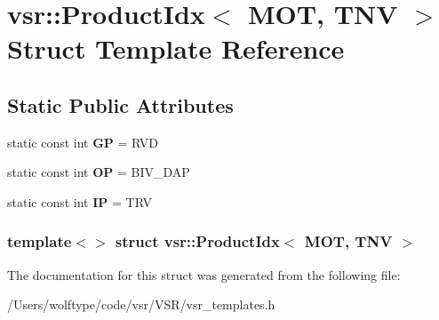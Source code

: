 \hypertarget{structvsr_1_1_product_idx_3_01_m_o_t_00_01_t_n_v_01_4}{\section{vsr\-:\-:Product\-Idx$<$ M\-O\-T, T\-N\-V $>$ Struct Template Reference}
\label{structvsr_1_1_product_idx_3_01_m_o_t_00_01_t_n_v_01_4}
}
\subsection*{Static Public Attributes}
\begin{DoxyCompactItemize}
\item 
\hypertarget{structvsr_1_1_product_idx_3_01_m_o_t_00_01_t_n_v_01_4_a5f560ba0be8e74ccd5d1ff06abb0e58a}{static const int {\bfseries G\-P} = R\-V\-D}\label{structvsr_1_1_product_idx_3_01_m_o_t_00_01_t_n_v_01_4_a5f560ba0be8e74ccd5d1ff06abb0e58a}

\item 
\hypertarget{structvsr_1_1_product_idx_3_01_m_o_t_00_01_t_n_v_01_4_a9c83ee43264472df5a951348a6f50f77}{static const int {\bfseries O\-P} = B\-I\-V\-\_\-\-D\-A\-P}\label{structvsr_1_1_product_idx_3_01_m_o_t_00_01_t_n_v_01_4_a9c83ee43264472df5a951348a6f50f77}

\item 
\hypertarget{structvsr_1_1_product_idx_3_01_m_o_t_00_01_t_n_v_01_4_aec0526483b682b00bec0d67e5b07371a}{static const int {\bfseries I\-P} = T\-R\-V}\label{structvsr_1_1_product_idx_3_01_m_o_t_00_01_t_n_v_01_4_aec0526483b682b00bec0d67e5b07371a}

\end{DoxyCompactItemize}
\subsubsection*{template$<$$>$ struct vsr\-::\-Product\-Idx$<$ M\-O\-T, T\-N\-V $>$}



The documentation for this struct was generated from the following file\-:\begin{DoxyCompactItemize}
\item 
/\-Users/wolftype/code/vsr/\-V\-S\-R/vsr\-\_\-templates.\-h\end{DoxyCompactItemize}
